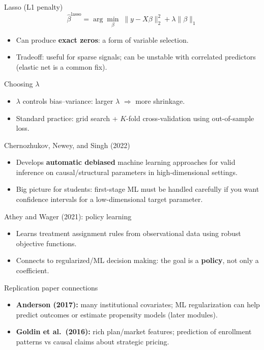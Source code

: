 \documentclass[aspectratio=169,11pt]{beamer}
\begin{document}
\begin{frame}{Lasso (L1 penalty)}
  \[
    \widehat{\beta}^{\text{lasso}}
    = \arg\min_{\beta} \;\|y - X\beta\|_2^2 + \lambda \|\beta\|_1
  \]
  \begin{itemize}
    \item Can produce \textbf{exact zeros}: a form of variable selection.
    \item Tradeoff: useful for sparse signals; can be unstable with correlated predictors (elastic net is a common fix).
  \end{itemize}
\end{frame}

\begin{frame}{Choosing \(\lambda\)}
  \begin{itemize}
    \item \(\lambda\) controls bias--variance: larger \(\lambda\) \(\Rightarrow\) more shrinkage.
    \item Standard practice: grid search + \(K\)-fold cross-validation using out-of-sample loss.
  \end{itemize}
\end{frame}

\begin{frame}{Chernozhukov, Newey, and Singh (2022)}
  \begin{itemize}
    \item Develops \textbf{automatic debiased} machine learning approaches for valid inference on causal/structural parameters in high-dimensional settings.
    \item Big picture for students: first-stage ML must be handled carefully if you want confidence intervals for a low-dimensional target parameter.
  \end{itemize}
\end{frame}

\begin{frame}{Athey and Wager (2021): policy learning}
  \begin{itemize}
    \item Learns treatment assignment rules from observational data using robust objective functions.
    \item Connects to regularized/ML decision making: the goal is a \textbf{policy}, not only a coefficient.
  \end{itemize}
\end{frame}

\begin{frame}{Replication paper connections}
  \begin{itemize}
    \item \textbf{Anderson (2017):} many institutional covariates; ML regularization can help predict outcomes or estimate propensity models (later modules).
    \item \textbf{Goldin et al.\ (2016):} rich plan/market features; prediction of enrollment patterns vs causal claims about strategic pricing.
  \end{itemize}
\end{frame}
\end{document}
